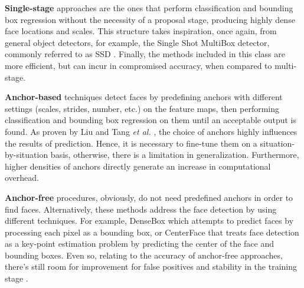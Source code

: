 \documentclass[class=report, crop=false, a4paper, 12pt]{standalone}
\begin{document}
\vspace{0.7\baselineskip}
\par \noindent \textbf{Single-stage} approaches \autocite{dengRetinaFaceSinglestageDense2019} are the ones that perform classification and bounding box regression without the necessity of a proposal stage, producing highly dense face locations and scales. This structure takes inspiration, once again, from general object detectors, for example, the Single Shot MultiBox detector, commonly referred to as SSD \autocite{liuSSDSingleShot2016}. Finally, the methods included in this class are more efficient, but can incur in compromised accuracy, when compared to multi-stage.

\vspace{0.7\baselineskip}
\par \noindent \textbf{Anchor-based} techniques \autocite{liuHAMBoxDelvingOnline2019, dengRetinaFaceSinglestageDense2019, zhangFaceDetectionUsing2018} detect faces by predefining anchors with different settings (scales, strides, number, etc.) on the feature maps, then performing classification and bounding box regression on them until an acceptable output is found. As proven by Liu and Tang \textit{et al.} \autocite{liuHAMBoxDelvingOnline2019}, the choice of anchors highly influences the results of prediction. Hence, it is necessary to fine-tune them on a situation-by-situation basis, otherwise, there is a limitation in generalization. Furthermore, higher densities of anchors directly generate an increase in computational overhead.

\vspace{0.7\baselineskip}
\par \noindent \textbf{Anchor-free} procedures, obviously, do not need predefined anchors in order to find faces. Alternatively, these methods address the face detection by using different techniques. For example, DenseBox \autocite{huangDenseBoxUnifyingLandmark2015} which attempts to predict faces by processing each pixel as a bounding box, or CenterFace \autocite{xuCenterFaceJointFace2019} that treats face detection as a key-point estimation problem by predicting the center of the face and bounding boxes. Even so, relating to the accuracy of anchor-free approaches, there's still room for improvement for false positives and stability in the training stage \autocite{duElementsEndtoendDeep2022}.
\end{document}
